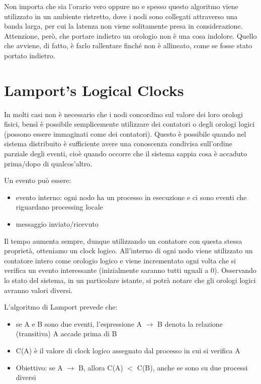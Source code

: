 Non importa che sia l'orario vero oppure no e spesso questo algoritmo viene utilizzato in un ambiente ristretto, dove i nodi sono collegati attraverso una banda larga, per cui la latenza non viene solitamente presa in considerazione. Attenzione, però, che portare indietro un orologio non è una cosa indolore. Quello che avviene, di fatto, è farlo rallentare finché non è allineato, come se fosse stato portato indietro.

\section{Lamport’s Logical Clocks}

In molti casi non è necessario che i nodi concordino sul valore dei loro orologi fisici, bensì è possibile semplicemente utilizzare dei contatori o degli orologi logici (possono essere immaginati come dei contatori). Questo è possibile quando nel sistema distribuito è sufficiente avere una conoscenza condivisa sull'ordine parziale degli eventi, cioè quando occorre che il sistema sappia cosa è accaduto prima/dopo di qualcos'altro. 

Un evento può essere:
\begin{itemize}
    \item evento interno: ogni nodo ha un processo in esecuzione e ci sono eventi che riguardano processing locale
    \item messaggio inviato/ricevuto
\end{itemize}

Il tempo aumenta sempre, dunque utilizzando un contatore con questa stessa proprietà, otteniamo un clock logico. All'interno di ogni nodo viene utilizzato un contatore intero come orologio logico e viene incrementato ogni volta che si verifica un evento interessante (inizialmente saranno tutti uguali a 0). Osservando lo stato del sistema, in un particolare istante, si potrà notare che gli orologi logici avranno valori diversi. 

L'algoritmo di Lamport prevede che:
\begin{itemize}
    \item se A e B sono due eventi, l'espressione A $\rightarrow$ B denota la relazione (transitiva) A accade prima di B
    \item C(A) è il valore di clock logico assegnato dal processo in cui si verifica A
    \item Obiettivo: se A $\rightarrow$ B, allora C(A) $<$ C(B), anche se sono su due processi diversi
\end{itemize}

